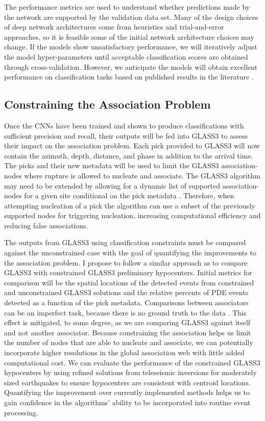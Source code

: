 \documentclass[12p]{article}
\begin{document}
The performance metrics are used to understand whether predictions made by the network are supported by the validation
data set. Many of the design choices of deep network architectures come from heuristics and trial-and-error approaches,
so it is feasible some of the initial network architecture choices may change. If the models show unsatisfactory
performance, we will iteratively adjust the model hyper-parameters until acceptable classification scores are obtained
through cross-validation. However, we anticipate the models will obtain excellent performance on classification tasks based on published results in the literature \citep{Perol2018, Ross2018a, Ross2018b, Zhu2019a, Zhu2019b}.

\subsection{Constraining the Association Problem}

Once the CNNs have been trained and shown to produce classifications with sufficient precision and recall, their outputs
will be fed into GLASS3 to assess their impact on the association problem. Each pick provided to GLASS3 will now contain
the azimuth, depth, distance, and phase in addition to the arrival time. The picks and their new metadata will be used
to limit the GLASS3 association-nodes where rupture is allowed to nucleate and associate. The GLASS3 algorithm may need
to be extended by allowing for a dynamic list of supported association-nodes for a given site conditional on the pick
metadata \citep{Yeck2019}. Therefore, when attempting nucleation of a pick the algorithm can use a subset of the
previously supported nodes for triggering nucleation, increasing computational efficiency and reducing false
associations.

The outputs from GLASS3 using classification constraints must be compared against the unconstrained case with the goal
of quantifying the improvements to the association problem. I propose to follow a similar approach as \citet{Yeck2019}
to compare GLASS3 with constrained GLASS3 preliminary hypocenters. Initial metrics for comparison will be the spatial
locations of the detected events from constrained and unconstrained GLASS3 solutions and the relative percents of PDE
events detected as a function of the pick metadata. Comparisons between associators can be an imperfect task, because
there is no ground truth to the data \citep{Yeck2019}. This effect is mitigated, to some degree, as we are comparing
GLASS3 against itself and not another associator. Because constraining the association helps us limit the number of
nodes that are able to nucleate and associate, we can potentially incorporate higher resolutions in the global
association web with little added computational cost. We can evaluate the performance of the constrained GLASS3
hypocenters by using refined solutions from teleseismic inversions \citep{Hayes2009, Ekstrom2012} for moderately sized
earthquakes to ensure hypocenters are consistent with centroid locations. Quantifying the improvement over
currently implemented methods helps us to gain confidence in the algorithms' ability to be incorporated into routine
event processing.
\end{document}
